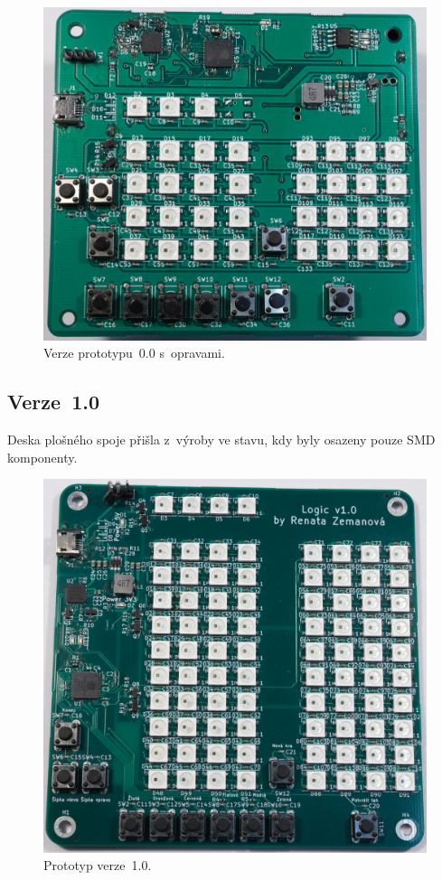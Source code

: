   \begin{figure}[!h]
    \begin{center}
      \includegraphics[scale=0.35]{obrazky/Verze0_opravy.jpg}
    \end{center}
    \caption[Verze prototypu~0.0 s~opravami]{Verze prototypu~0.0 s~opravami.}
  \end{figure}

  \newpage
  \subsection{Verze~1.0}
  Deska plošného spoje přišla z~výroby ve stavu, kdy byly osazeny pouze SMD komponenty. 

  \begin{figure}[!h]
    \begin{center}
      \includegraphics[scale=0.45]{obrazky/Verze1.jpg}
    \end{center}
    \caption[Prototyp verze~1.0]{Prototyp verze~1.0.}
  \end{figure}

